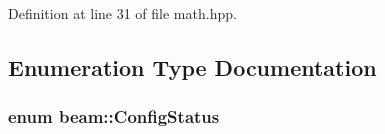 Definition at line 31 of file math.\+hpp.



\subsection{Enumeration Type Documentation}
\subsubsection[{\texorpdfstring{Config\+Status}{ConfigStatus}}]{\setlength{\rightskip}{0pt plus 5cm}enum {\bf beam\+::\+Config\+Status}\hspace{0.3cm}{\ttfamily [strong]}}\hypertarget{group__utils_ga6b948c6f49abd3a3de95390efacfba63}{}\label{group__utils_ga6b948c6f49abd3a3de95390efacfba63}
